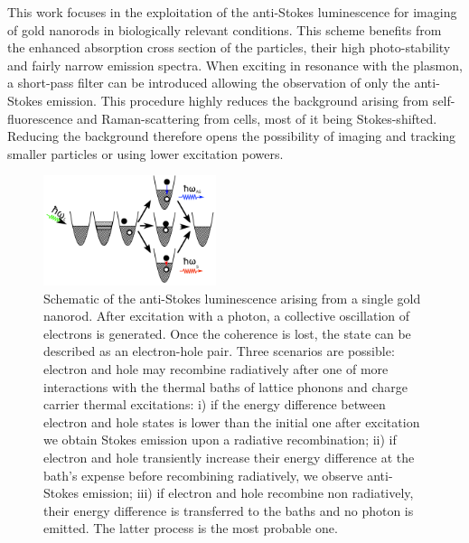 This work focuses in the exploitation of the anti-Stokes
luminescence\cite{Jiang2013} for imaging of gold nanorods in biologically
relevant conditions. This scheme benefits from the enhanced absorption cross
section of the particles, their high photo-stability and fairly narrow emission
spectra. When exciting in resonance with the plasmon, a short-pass filter can be
introduced allowing the observation of only the anti-Stokes emission. This
procedure highly reduces the background arising from
self-fluorescence and Raman-scattering from cells, most of it being
Stokes-shifted. Reducing the background therefore opens the possibility of
imaging and tracking smaller particles or using lower excitation powers.

\begin{figure}[htp] \centering
\includegraphics[width=0.45\textwidth]{Chapters/03_Background_Free/Figures/02_Scheme/luminescence_all_AS.png}
\caption{Schematic of the anti-Stokes luminescence arising from a single gold
nanorod. After excitation with a photon, a collective oscillation of electrons
is generated. Once the coherence is lost, the state can be described as an
electron-hole pair. Three scenarios are possible: electron and hole may
recombine radiatively after one of more interactions with the thermal baths of
lattice phonons and charge carrier thermal excitations: i) if the energy
difference between electron and hole states is lower than the initial one after
excitation we obtain Stokes emission upon a radiative recombination; ii) if
electron and hole transiently increase their energy difference at the bath's
expense before recombining radiatively, we observe anti-Stokes emission; iii) if
electron and hole recombine non radiatively, their energy difference is
transferred to the baths and no photon is emitted. The latter process is the
most probable one.}
	\label{fig:anti-Stokes-process}
\end{figure}

